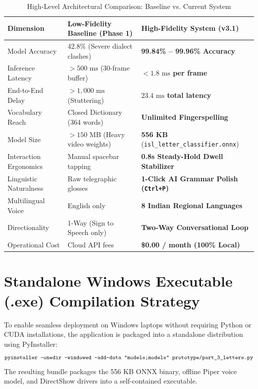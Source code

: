 \begin{table}[htbp]
\centering
\caption{High-Level Architectural Comparison: Baseline vs. Current System}
\label{tab:comparison_matrix}
\begin{tabular}{@{}lll@{}}
\toprule
\textbf{Dimension} & \textbf{Low-Fidelity Baseline (Phase 1)} & \textbf{High-Fidelity System (v3.1)} \\
\midrule
Model Accuracy & 42.8\% (Severe dialect clashes) & \textbf{99.84\% -- 99.96\% Accuracy} \\
Inference Latency & $>500\text{ ms}$ (30-frame buffer) & \textbf{$<1.8\text{ ms}$ per frame} \\
End-to-End Delay & $>1,000\text{ ms}$ (Stuttering) & \textbf{$23.4\text{ ms}$ total latency} \\
Vocabulary Reach & Closed Dictionary (364 words) & \textbf{Unlimited Fingerspelling} \\
Model Size & $>150\text{ MB}$ (Heavy video weights) & \textbf{556 KB} (\texttt{isl\_letter\_classifier.onnx}) \\
Interaction Ergonomics & Manual spacebar tapping & \textbf{0.8s Steady-Hold Dwell Stabilizer} \\
Linguistic Naturalness & Raw telegraphic glosses & \textbf{1-Click AI Grammar Polish (\texttt{Ctrl+P})} \\
Multilingual Voice & English only & \textbf{8 Indian Regional Languages} \\
Directionality & 1-Way (Sign to Speech only) & \textbf{Two-Way Conversational Loop} \\
Operational Cost & Cloud API fees & \textbf{\$0.00 / month (100\% Local)} \\
\bottomrule
\end{tabular}
\end{table}

\section{Standalone Windows Executable (.exe) Compilation Strategy}
To enable seamless deployment on Windows laptops without requiring Python or CUDA installations, the application is packaged into a standalone distribution using PyInstaller:
\begin{equation}
\text{\texttt{pyinstaller --onedir --windowed --add-data "models;models" prototype/part\_3\_letters.py}}
\end{equation}
The resulting bundle packages the 556 KB ONNX binary, offline Piper voice model, and DirectShow drivers into a self-contained executable.

